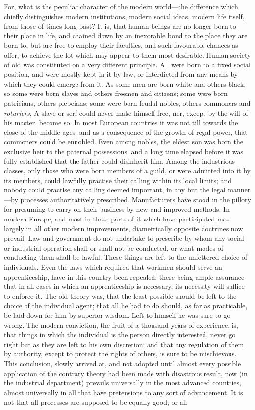 \documentclass[12pt]{report}
\begin{document}
For, what is the peculiar character of the modern world—the difference which chiefly distinguishes modern institutions, modern social ideas, modern life itself, from those of times long past? It is, that human beings are no longer born to their place in life, and chained down by an inexorable bond to the place they are born to, but are free to employ their faculties, and such favourable chances as offer, to achieve the lot which may appear to them most desirable. Human society of old was constituted on a very different principle. All were born to a fixed social position, and were mostly kept in it by law, or interdicted from any means by which they could emerge from it. As some men are born white and others black, so some were born slaves and others freemen and citizens; some were born patricians, others plebeians; some were born feudal nobles, others commoners and \emph{roturiers}. A slave or serf could never make himself free, nor, except by the will of his master, become so. In most European countries it was not till towards the close of the middle ages, and as a consequence of the growth of regal power, that commoners could be ennobled. Even among nobles, the eldest son was born the exclusive heir to the paternal possessions, and a long time elapsed before it was fully established that the father could disinherit him. Among the industrious classes, only those who were born members of a guild, or were admitted into it by its members, could lawfully practise their calling within its local limits; and nobody could practise any calling deemed important, in any but the legal manner—by processes authoritatively prescribed. Manufacturers have stood in the pillory for presuming to carry on their business by new and improved methods. In modern Europe, and most in those parts of it which have participated most largely in all other modern improvements, diametrically opposite doctrines now prevail. Law and government do not undertake to prescribe by whom any social or industrial operation shall or shall not be conducted, or what modes of conducting them shall be lawful. These things are left to the unfettered choice of individuals. Even the laws which required that workmen should serve an apprenticeship, have in this country been repealed: there being ample assurance that in all cases in which an apprenticeship is necessary, its necessity will suffice to enforce it. The old theory was, that the least possible should be left to the choice of the individual agent; that all he had to do should, as far as practicable, be laid down for him by superior wisdom. Left to himself he was sure to go wrong. The modern conviction, the fruit of a thousand years of experience, is, that things in which the individual is the person directly interested, never go right but as they are left to his own discretion; and that any regulation of them by authority, except to protect the rights of others, is sure to be mischievous. This conclusion, slowly arrived at, and not adopted until almost every possible application of the contrary theory had been made with disastrous result, now (in the industrial department) prevails universally in the most advanced countries, almost universally in all that have pretensions to any sort of advancement. It is not that all processes are supposed to be equally good, or all 
\end{document}
